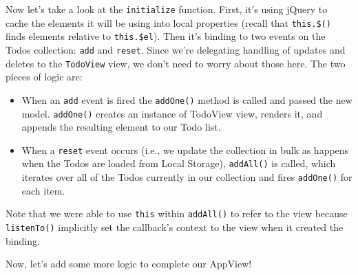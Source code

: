 \documentclass[9pt]{book}
\begin{document}
Now let's take a look at the \texttt{initialize} function. First, it's
using jQuery to cache the elements it will be using into local
properties (recall that \texttt{this.\$()} finds elements relative to
\texttt{this.\$el}). Then it's binding to two events on the Todos
collection: \texttt{add} and \texttt{reset}. Since we're delegating
handling of updates and deletes to the \texttt{TodoView} view, we don't
need to worry about those here. The two pieces of logic are:

\begin{itemize}
\item
  When an \texttt{add} event is fired the \texttt{addOne()} method is
  called and passed the new model. \texttt{addOne()} creates an instance
  of TodoView view, renders it, and appends the resulting element to our
  Todo list.
\item
  When a \texttt{reset} event occurs (i.e., we update the collection in
  bulk as happens when the Todos are loaded from Local Storage),
  \texttt{addAll()} is called, which iterates over all of the Todos
  currently in our collection and fires \texttt{addOne()} for each item.
\end{itemize}

Note that we were able to use \texttt{this} within \texttt{addAll()} to
refer to the view because \texttt{listenTo()} implicitly set the
callback's context to the view when it created the binding.

Now, let's add some more logic to complete our AppView!
\end{document}
